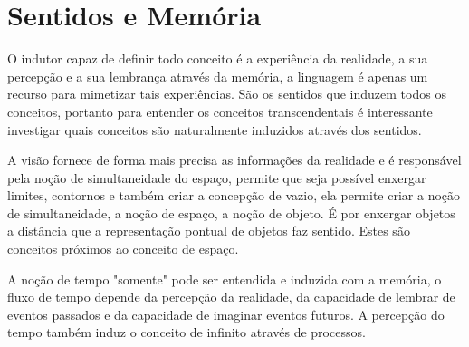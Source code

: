 \documentclass[10pt,a4paper]{report}
\begin{document}
\section{Sentidos e Memória}

\hspace{\baselineskip}

O indutor capaz de definir todo conceito é a experiência da realidade, a sua percepção e a sua lembrança através da memória, a linguagem é apenas um recurso para mimetizar tais experiências. São os sentidos que induzem todos os conceitos, portanto para entender os conceitos transcendentais é interessante investigar quais conceitos são naturalmente induzidos através dos sentidos. 


A visão fornece de forma mais precisa as informações da realidade e é responsável pela noção de simultaneidade do espaço, permite que seja possível enxergar limites, contornos e também criar a concepção de vazio, ela permite criar a noção de simultaneidade, a noção de espaço, a noção de objeto. É por enxergar objetos a distância que a representação pontual de objetos faz sentido. Estes são conceitos próximos ao conceito de espaço. 

A noção de tempo "somente" pode ser entendida e induzida com a memória, o fluxo de tempo depende da percepção da realidade, da capacidade de lembrar de eventos passados e da capacidade de imaginar eventos futuros. A percepção do tempo também induz o conceito de infinito através de processos.

\end{document}

